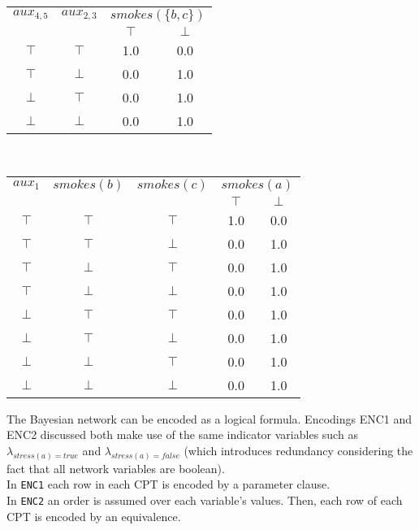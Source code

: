 \begin{center}
	\begin{tabular}{cc|cc}
		\underline{$aux_{4,5}$} & \underline{$aux_{2,3}$} & \multicolumn{2}{c}{\underline{$smokes(\{b,c\})$}} \\
		& & $\top$ & $\bot$ \\
		$\top$ & $\top$ & 1.0 & 0.0 \\
		$\top$ & $\bot$ & 0.0 & 1.0 \\
		$\bot$ & $\top$ & 0.0 & 1.0 \\
		$\bot$ & $\bot$ & 0.0 & 1.0 \\
	\end{tabular}
	\vspace{0.5cm}\\
	
	\begin{tabular}{ccc|cc}
		\underline{$aux_{1}$} & \underline{$smokes(b)$} & \underline{$smokes(c)$} & \multicolumn{2}{c}{\underline{$smokes(a)$}} \\
		& & & $\top$ & $\bot$ \\
		$\top$ & $\top$ & $\top$ & 1.0 & 0.0 \\
		$\top$ & $\top$ & $\bot$ & 0.0 & 1.0 \\
		$\top$ & $\bot$ & $\top$ & 0.0 & 1.0 \\
		$\top$ & $\bot$ & $\bot$ & 0.0 & 1.0 \\
		$\bot$ & $\top$ & $\top$ & 0.0 & 1.0 \\
		$\bot$ & $\top$ & $\bot$ & 0.0 & 1.0 \\
		$\bot$ & $\bot$ & $\top$ & 0.0 & 1.0 \\
		$\bot$ & $\bot$ & $\bot$ & 0.0 & 1.0 \\
	\end{tabular}
	\vspace{0.5cm}

\end{center}



The Bayesian network can be encoded as a logical formula. Encodings ENC1 and ENC2 discussed \cite{chavira} both make use of the same indicator variables such as $\lambda_{stress(a)=true}$ and $\lambda_{stress(a)=false}$ (which introduces redundancy considering the fact that all network variables are boolean). \\

\noindent In \texttt{ENC1} each row in each CPT is encoded by a parameter clause.\\
\noindent In \texttt{ENC2} an order is assumed over each variable's values. Then, each row of each CPT is encoded by an equivalence.\\

